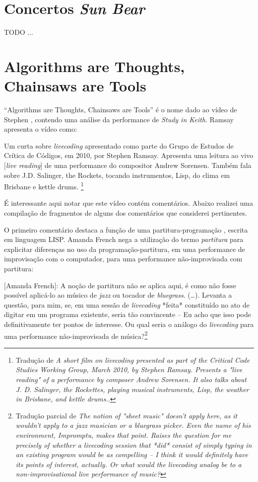 \section{Concertos \emph{Sun Bear}}\label{sec:sunbear}

TODO ...

\section{Algorithms are Thoughts, Chainsaws are Tools}

``Algorithms are Thoughts, Chainsaws are Tools'' é o nome dado ao vídeo de Stephen , contendo uma análise da performance de \emph{Study in Keith}. Ramsay apresenta o vídeo como:

\begin{citacao}
Um curta sobre \emph{livecoding} apresentado como parte do Grupo de Estudos de Crítica de Códigos, em 2010, por Stephen Ramsay. Apresenta uma leitura ao vivo $[$\emph{live reading}$]$ de uma performance do compositor Andrew Sorensen. Também fala sobre J.D. Salinger, the Rockets, tocando instrumentos, Lisp, do clima em Brisbane e kettle drums. \footnote{Tradução de \emph{A short film on livecoding presented as part of the Critical Code Studies Working Group, March 2010, by Stephen Ramsay. Presents a "live reading" of a performance by composer Andrew Sorensen. It also talks about J. D. Salinger, the Rockettes, playing musical instruments, Lisp, the weather in Brisbane, and kettle drums.}.}
\end{citacao}
É interessante aqui notar que este vídeo contém comentários. Abaixo realizei uma compilação de fragmentos de alguns dos comentários que considerei pertinentes. 

O primeiro comentário destaca a função de uma partitura-programação \cite[p.~5]{fenerich_marulho_2014}, escrita em linguagem LISP. Amanda French nega a utilização do termo \emph{partitura} para explicitar diferenças no uso da programação-partitura, em uma performance de improvisação com o computador, para uma performance não-improvisada com partitura:

\begin{citacao}
$[$Amanda French$]$: A noção de partitura não se aplica aqui, é como não fosse possível aplicá-lo ao músico de \emph{jazz} ou tocador de \emph{bluegrass}. (\ldots). Levanta a questão, para mim, se, em uma sessão de \emph{livecoding} *feita* constituído no ato de digitar em um programa existente, seria tão convincente -- Eu acho que isso pode definitivamente ter pontos de interesse. Ou qual seria o análogo do \emph{livecoding} para uma performance não-improvisada de música?\footnote{Tradução parcial de \emph{The notion of "sheet music" doesn't apply here, as it wouldn't apply to a jazz musician or a bluegrass picker. Even the name of his environment, Impromptu, makes that point. Raises the question for me precisely of whether a livecoding session that *did* consist of simply typing in an existing program would be as compelling -- I think it would definitely have its points of interest, actually. Or what would the livecoding analog be to a non-improvisational live performance of music?}}
\end{citacao}

